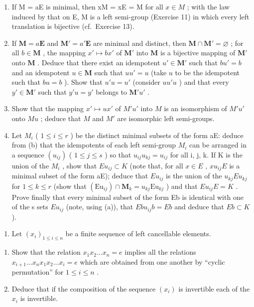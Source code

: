 \begin{enumerate}
\def\labelenumi{(\alph{enumi})}
\item
  If M = aE is minimal, then xM = xE = M for all \(x \in M\) ; with the law induced by that on E, M is a left semi-group (Exercise 11) in which every left translation is bijective (cf.~Exercise 13).
\item
  If \(\mathbf{M} = a\mathbf{E}\) and \(\mathbf{M}' = a'\mathbf{E}\) are minimal and distinct, then \(\mathbf{M} \cap \mathbf{M}' = \varnothing\) ; for all \(b \in \mathbf{M}\) , the mapping \(x' \mapsto bx'\) of \(\mathbf{M}'\) into \(\mathbf{M}\) is a bijective mapping of \(\mathbf{M}'\) onto \(\mathbf{M}\) . Deduce that there exist an idempotent \(u' \in \mathbf{M}'\) such that \(bu' = b\) and an idempotent \(u \in \mathbf{M}\) such that \(uu' = u\) (take \(u\) to be the idempotent such that \(bu = b\) ). Show that \(u'u = u'\) (consider \(uu'u\) ) and that every \(y' \in \mathbf{M}'\) such that \(y'u = y'\) belongs to \(\mathbf{M}'u'\) .
\item
  Show that the mapping \(x' \mapsto ux'\) of \(M'u'\) into \(M\) is an isomorphism of \(M'u'\) onto \(Mu\) ; deduce that \(M\) and \(M'\) are isomorphic left semi-groups.
\item
  Let \(M_{i}\) ( \(1 \leqslant i \leqslant r\) ) be the distinct minimal subsets of the form aE: deduce from (b) that the idempotents of each left semi-group \(M_{i}\) can be arranged in a sequence \((u_{ij})\) ( \(1 \leqslant j \leqslant s\) ) so that \(u_{ij}u_{kj} = u_{ij}\) for all i, j, k. If K is the union of the \(M_{i}\) , show that \(Eu_{ij} \subset K\) (note that, for all \(x \in E\) , \(xu_{ij}E\) is a minimal subset of the form aE); deduce that \(Eu_{ij}\) is the union of the \(u_{kj}Eu_{kj}\) for \(1 \leqslant k \leqslant r\) (show that \((\mathrm{Eu}_{ij}) \cap \mathbf{M}_{k} = u_{kj}\mathrm{Eu}_{kj}\) ) and that \(Eu_{ij}E = K\) . Prove finally that every minimal subset of the form Eb is identical with one of the s sets \(Eu_{ij}\) (note, using (a)), that \(Ebu_{ij}b = Eb\) and deduce that \(Eb \subset K\) ).
\end{enumerate}

\begin{enumerate}
\def\labelenumi{\arabic{enumi}.}
\setcounter{enumi}{14}
\tightlist
\item
  Let \((x_{i})_{1\leqslant i\leqslant n}\) be a finite sequence of left cancellable elements.
\end{enumerate}

\begin{enumerate}
\def\labelenumi{(\alph{enumi})}
\item
  Show that the relation \(x_{1}x_{2}\ldots x_{n} = e\) implies all the relations \(x_{i + 1}\ldots x_nx_1x_2\ldots x_i = e\) which are obtained from one another by ``cyclic permutation'' for \(1\leqslant i\leqslant n\) .
\item
  Deduce that if the composition of the sequence \((x_{i})\) is invertible each of the \(x_{i}\) is invertible.
\end{enumerate}

